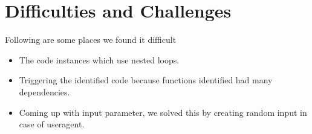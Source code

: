 \documentclass[authoryear,preprint]{sigplanconf}
\begin{document}
\section{Difficulties and Challenges}

Following are some places we found it difficult
\begin{itemize}
\item The code instances which use nested loops.
\item Triggering the identified code because functions identified had many dependencies.
\item Coming up with input parameter, we solved this by creating random input in case of useragent.
\end{itemize}

\citep{Aho86-Compilers}

\end{document}

